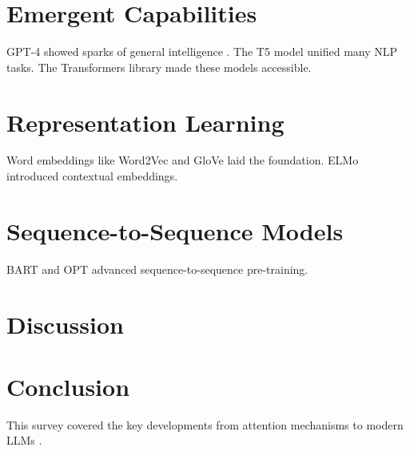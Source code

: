 \documentclass[11pt]{article}
\begin{document}
\lipsum[21-23]

\section{Emergent Capabilities}
\lipsum[24-26]
GPT-4 showed sparks of general intelligence \cite{bubeck-etal-2023-sparks}. The T5 model \cite{raffel-etal-2020-exploring} unified many NLP tasks. The Transformers library \cite{wolf-etal-2020-transformers} made these models accessible.

\lipsum[27-29]

\section{Representation Learning}
\lipsum[30-32]
Word embeddings like Word2Vec \cite{mikolov-etal-2013-distributed} and GloVe \cite{pennington-etal-2014-glove} laid the foundation. ELMo \cite{peters-etal-2018-deep} introduced contextual embeddings.

\lipsum[33-35]

\section{Sequence-to-Sequence Models}
\lipsum[36-38]
BART \cite{lewis-etal-2020-bart} and OPT \cite{zhang-etal-2022-opt} advanced sequence-to-sequence pre-training.

\lipsum[39-41]

\section{Discussion}
\lipsum[42-44]

\section{Conclusion}
\lipsum[45-46]
This survey covered the key developments from attention mechanisms \cite{vaswani-etal-2017-attention} to modern LLMs \cite{touvron-etal-2023-llama,chowdhery-etal-2022-palm}.



\end{document}
